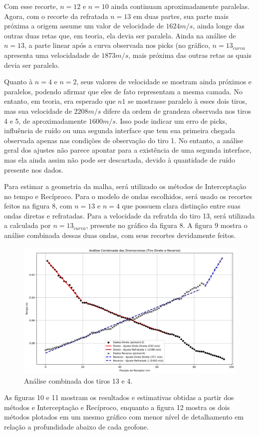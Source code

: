 \documentclass[a4paper,12pt]{article}
\begin{document}
Com esse recorte, $n=12$ e $n=10$ ainda continuam aproximadamente paralelas. Agora, com o recorte da refratada $n=13$ em duas partes, sua parte mais próxima a origem assume um valor de velocidade de $1624 m/s$, ainda longe das outras duas retas que, em teoria, ela devia ser paralela. Ainda na análise de $n=13$, a parte linear após a curva observada nos picks (no gráfico, $n=13_{curva}$ apresenta uma velocidadade de $1873 m/s$, mais próxima das outras retas as quais devia ser paralelo. 

Quanto à $n=4$ e $n=2$, seus valores de velocidade se mostram ainda próximos e paralelos, podendo afirmar que eles de fato representam a mesma camada. No entanto, em teoria, era esperado que $n1$ se mostrasse paralelo à esses dois tiros, mas sua velocidade de $2208 m/s$ difere da ordem de grandeza observada nos tiros 4 e 5, de aproximadamente $1600 m/s$. Isso pode indicar um erro de picks, influência de ruído ou uma segunda interface que tem sua primeira chegada observada apenas nas condições de observação do tiro 1. No entanto, a análise geral dos ajustes não parece apontar para a existência de uma segunda interface, mas ela ainda assim não pode ser descartada, devido à quantidade de ruído presente nos dados. 

Para estimar a geometria da malha, será utilizado os métodos de Interceptação no tempo e Recíproco. Para o modelo de ondas escolhidos, será usado os recortes feitos na figura 8, com $n=13$ e $n=4$ que possuem clara distinção entre suas ondas diretas e refratadas. Para a velocidade da refratda do tiro 13, será utilizada a calculada por $n=13_{curva}$, presente no gráfico da figura 8. A figura 9 mostra o análise combinada dessas duas ondas, com seus recortes devidamente feitos. 

\begin{figure}[H]
    \centering
    \includegraphics[width=0.5\linewidth]{dromocronas_combinadas.png}
    \caption{Análise combinada dos tiros 13 e 4.}
    \label{fig:placeholder}
\end{figure}


As figuras 10 e 11 mostram os resultados e estimativas obtidas a partir dos métodos e Interceptação e Recíproco, enquanto a figura 12 mostra os dois métodos plotados em um mesmo gráfico com menor nível de detalhamento em relação a profundidade abaixo de cada geofone.
\end{document}
